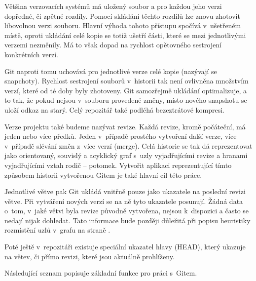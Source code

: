 \documentclass[
  biblatex,
  glossaries,
  index
]{kidiplom}
\begin{document}
Většina verzovacích systémů má uložený soubor a pro každou jeho verzi dopředné, či zpětné rozdíly. Pomocí skládání těchto rozdílů lze znovu zhotovit libovolnou verzi souboru. Hlavní výhoda tohoto přístupu spočívá v~ušetřeném místě, oproti ukládání celé kopie se totiž ušetří části, které se mezi jednotlivými verzemi nezměnily. Má to však dopad na rychlost opětovného sestrojení  konkrétních verzí.

Git naproti tomu uchovává pro jednotlivé verze celé kopie (nazývají se snapchoty). Rychlost sestrojení souborů v~historii tak není ovlivněna množstvím verzí, které od té doby byly zhotoveny. Git samozřejmě ukládání optimalizuje, a to tak, že pokud nejsou v~souboru provedené změny, místo nového snapshotu se uloží odkaz na starý. Celý repozitář také podléhá bezeztrátové kompresi.

Verze projektu také budeme nazývat revize. Každá revize, kromě počáteční, má jeden nebo více předků. Jeden v~případě prostého vytvoření další verze, více v~případě slévání změn z~více verzí (merge). Celá historie se tak dá reprezentovat jako orientovaný, souvislý a acyklický graf s~uzly vyjadřujícími revize a hranami vyjadřujícími vztah rodič -- potomek. Vytvořit aplikaci reprezentující tímto způsobem historii vytvořenou Gitem je také hlavní cíl této práce.

Jednotlivé větve pak Git ukládá vnitřně pouze jako ukazatele na poslední revizi větve. Při vytváření nových verzí se na ně tyto ukazatele posunují. Žádná data o~tom, v~jaké větvi byla revize původně vytvořena, nejsou k~dispozici a často se nedají nijak dohledat. Tato informace bude později důležitá při popisu heuristiky rozmístění uzlů v~grafu na straně \pageref{subsec:algorithm}.

Poté ještě v~repozitáři existuje speciální ukazatel hlavy (HEAD), který ukazuje na větev, či přímo revizi, které jsou aktuálně prohlíženy.

Následující seznam popisuje základní funkce pro práci s~Gitem.
\end{document}
